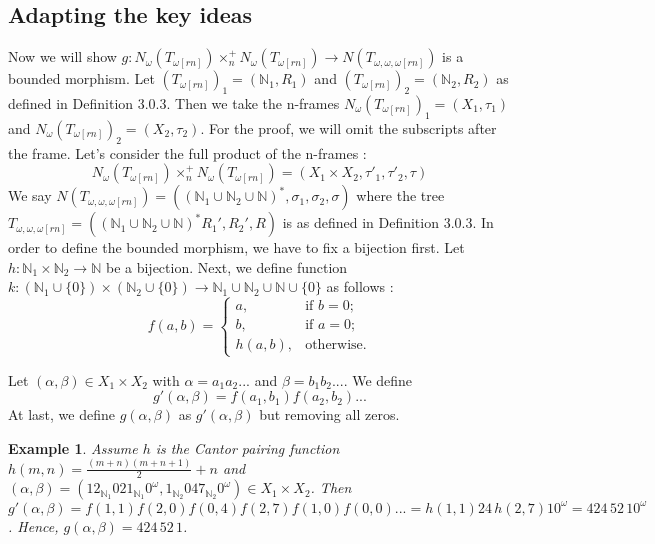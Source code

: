 \documentclass[12pt, a4paper]{scrartcl}
\newtheorem{example}[definition]{Example}
\begin{document}
\subsection{Adapting the key ideas}

    Now we will show $g : N_\omega(T_{\omega[rn]}) \times^+_n N_\omega(T_{\omega[rn]}) \rightarrow N(T_{\omega,\omega,\omega[rn]})$ is a bounded morphism. \newline 
    Let $(T_{\omega[rn]})_1 = (\mathbb{N}_{1}, R_1)$ and $(T_{\omega[rn]})_2 = (\mathbb{N}_{2}, R_2)$ as defined in Definition 3.0.3.
    Then we take the n-frames $N_\omega(T_{\omega[rn]})_1 = (X_1, \tau_1)$ and $N_\omega(T_{\omega[rn]})_2 = (X_2, \tau_2)$. For the proof, we will omit the subscripts after the frame. \newline \newline
    Let's consider the full product of the n-frames :
    $$N_\omega(T_{\omega[rn]}) \times^+_n N_\omega(T_{\omega[rn]}) = (X_1 \times X_2, \tau'_1, \tau'_2, \tau)$$
    \newline We say $N(T_{\omega,\omega,\omega[rn]}) = ((\mathbb{N}_1 \cup \mathbb{N}_2\cup \mathbb{N})^*, \sigma_1, \sigma_2, \sigma)$ where the tree $T_{\omega,\omega,\omega[rn]} = ((\mathbb{N}_1 \cup \mathbb{N}_2 \cup \mathbb{N})^*R_1',R_2',R)$ is as defined in Definition 3.0.3.
    \clearpage
    In order to define the bounded morphism, we have to fix a bijection first. Let $h : \mathbb{N}_1 \times \mathbb{N}_2 \rightarrow \mathbb{N}$ be a bijection. \newline
    Next, we define function $k :(\mathbb{N}_1 \cup \{0\}) \times (\mathbb{N}_2 \cup \{0\}) \rightarrow \mathbb{N}_1 \cup \mathbb{N}_2 \cup \mathbb{N} \cup \{0\}$ as follows :
    \[
        f(a, b) =
        \begin{cases}
        a, & \text{if } b = 0; \\
        b, & \text{if } a = 0; \\
        h(a, b), & \text{otherwise}.
        \end{cases}
    \]

    Let $(\alpha,\beta) \in X_1 \times X_2$ with $\alpha = a_1a_2...$ and $\beta = b_1b_2...$. We define 
    $$g'(\alpha,\beta) = f(a_1,b_1)f(a_2,b_2)...$$
    At last, we define $g(\alpha,\beta)$ as $g'(\alpha,\beta)$ but removing all zeros.

    \begin{example}
        Assume $h$ is the Cantor pairing function $h(m,n) = \frac{(m+n)(m+n+1)}{2} + n$ and $(\alpha, \beta) = (12_{\mathbb{N}_1}021_{\mathbb{N}_1}0^\omega, 1_{\mathbb{N}_2}047_{\mathbb{N}_2} 0^\omega) \in X_1 \times X_2$. \newline \newline
         Then $g'(\alpha, \beta) = f(1,1)f(2,0)f(0,4)f(2,7)f(1,0)f(0,0) ... = h(1,1)24 \, h(2,7)10^\omega = 424 \, 52 \, 10^\omega$.
         Hence, $g(\alpha, \beta) = 424 \, 52 \, 1$. 
    \end{example}
\end{document}
